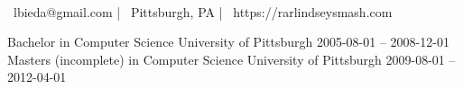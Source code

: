 \documentclass[]{awesome-cv}
\begin{document}
    
\begin{center}
	  \\
	\vspace{2mm}
	{\faEnvelope\ lbieda@gmail.com} | {\faMapMarker\ Pittsburgh, PA} | {\faLink\ https://rarlindseysmash.com}
\end{center}
\begin{cventries}
	\cventry
	{Bachelor in Computer Science}
	{University of Pittsburgh}
	{}
	{2005-08-01 – 2008-12-01}
	{}
	\cventry
	{Masters (incomplete) in Computer Science}
	{University of Pittsburgh}
	{}
	{2009-08-01 – 2012-04-01}
	{}
\end{cventries}
\end{document}

